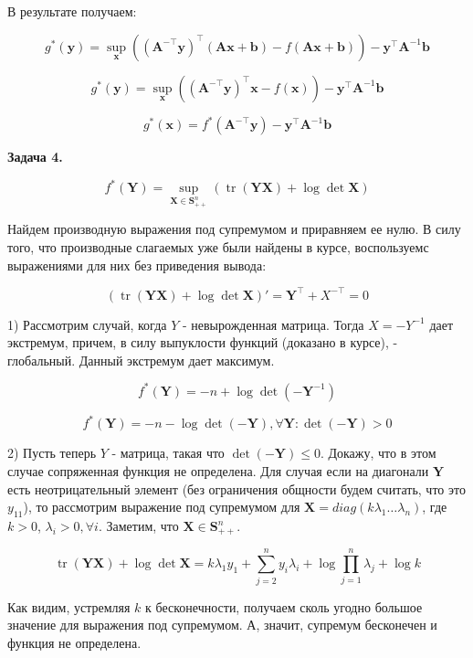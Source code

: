 \documentclass[12pt]{article}
\DeclareMathOperator*{\tr}{tr}
\begin{document}
В результате получаем:

$$g^*(\textbf{y}) = \sup\limits_{\textbf{x}}\left((\textbf{A}^{-\top}\textbf{y})^\top\left(\textbf{A}\textbf{x} + \textbf{b}\right) - f(\textbf{Ax}+\textbf{b})\right) - \textbf{y}^\top \textbf{A}^{-1} \textbf{b}$$

$$g^*(\textbf{y}) = \sup\limits_{\textbf{x}}\left((\textbf{A}^{-\top}\textbf{y})^\top\textbf{x} - f(\textbf{x})\right) - \textbf{y}^\top \textbf{A}^{-1} \textbf{b}$$

$$\boxed{g^*(\textbf{x}) = f^*(\textbf{A}^{-\top}\textbf{y}) - \textbf{y}^\top \textbf{A}^{-1} \textbf{b}}$$

\begin{center}
	\textbf{Задача 4.}
\end{center}

$$f^*(\textbf{Y}) = \sup\limits_{\textbf{X} \in \textbf{S}^n_{++}}\left(\tr(\textbf{YX}) + \log\det\textbf{X} \right)$$

Найдем производную выражения под супремумом и приравняем ее нулю. В силу того, что производные слагаемых уже были найдены в курсе, воспользуемс выражениями для них без приведения вывода:

$$\left(\tr(\textbf{YX}) + \log\det\textbf{X} \right)' = \textbf{Y}^{\top} + X^{-\top} = 0$$

1) Рассмотрим случай, когда $Y$ - невырожденная матрица. Тогда $X = -Y^{-1}$ дает экстремум, причем, в силу выпуклости функций (доказано в курсе), - глобальный. Данный экстремум дает максимум.

$$f^*(\textbf{Y}) = -n + \log\det(-\textbf{Y}^{-1})$$

$$f^*(\textbf{Y}) = -n - \log\det(-\textbf{Y}), \forall \textbf{Y}: \det(-\textbf{Y}) > 0$$

2) Пусть теперь $Y$ - матрица, такая что $\det(-\textbf{Y})\leq 0$. Докажу, что в этом случае сопряженная функция не определена. Для случая если на диагонали $\textbf{Y}$ есть неотрицательный элемент (без ограничения общности будем считать, что это $y_{11}$), то рассмотрим выражение под супремумом для $\textbf{X}=diag(k\lambda_1\dots \lambda_n)$, где $k>0$, $\lambda_i>0, \forall i$. Заметим, что $\textbf{X} \in \textbf{S}^n_{++}$.

$$\tr(\textbf{YX}) + \log\det\textbf{X} = k\lambda_1 y_1 +\sum\limits_{j=2}^ny_i \lambda_i + \log \prod_{j=1}^n\lambda_j+\log k$$

Как видим, устремляя $k$ к бесконечности, получаем сколь угодно большое значение для выражения под супремумом. А, значит, супремум бесконечен и функция не определена.
\end{document}
